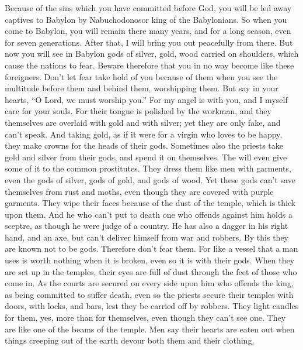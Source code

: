  Because of the sins which you have committed before God,
you will be led away captives to Babylon by Nabuchodonosor king of the
Babylonians.  So when you come to Babylon, you will remain
there many years, and for a long season, even for seven generations.
After that, I will bring you out peacefully from there.  But
now you will see in Babylon gods of silver, gold, wood carried on
shoulders, which cause the nations to fear.  Beware
therefore that you in no way become like these foreigners. Don't let
fear take hold of you because of them when you see the multitude before
them and behind them, worshipping them.  But say in your
hearts, ``O Lord, we must worship you.''  For my angel is
with you, and I myself care for your souls.  For their
tongue is polished by the workman, and they themselves are overlaid with
gold and with silver; yet they are only fake, and can't speak.
 And taking gold, as if it were for a virgin who loves to be
happy, they make crowns for the heads of their gods. 
Sometimes also the priests take gold and silver from their gods, and
spend it on themselves.  The will even give some of it to
the common prostitutes. They dress them like men with garments, even the
gods of silver, gods of gold, and gods of wood.  Yet these
gods can't save themselves from rust and moths, even though they are
covered with purple garments.  They wipe their faces
because of the dust of the temple, which is thick upon them.
 And he who can't put to death one who offends against him
holds a sceptre, as though he were judge of a country.  He
has also a dagger in his right hand, and an axe, but can't deliver
himself from war and robbers.  By this they are known not
to be gods. Therefore don't fear them.  For like a vessel
that a man uses is worth nothing when it is broken, even so it is with
their gods. When they are set up in the temples, their eyes are full of
dust through the feet of those who come in.  As the courts
are secured on every side upon him who offends the king, as being
committed to suffer death, even so the priests secure their temples with
doors, with locks, and bars, lest they be carried off by robbers.
 They light candles for them, yes, more than for
themselves, even though they can't see one.  They are like
one of the beams of the temple. Men say their hearts are eaten out when
things creeping out of the earth devour both them and their clothing.
